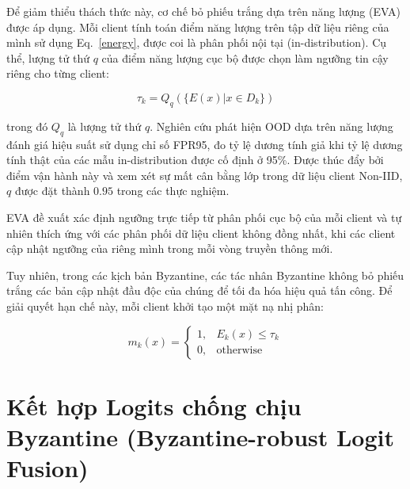 Để giảm thiểu thách thức này, cơ chế bỏ phiếu trắng dựa trên năng lượng (EVA) được áp dụng. Mỗi client tính toán điểm năng lượng trên tập dữ liệu riêng của mình sử dụng Eq.~\ref{energy}, được coi là phân phối nội tại (in-distribution). Cụ thể, lượng tử thứ $q$ của điểm năng lượng cục bộ được chọn làm ngưỡng tin cậy riêng cho từng client:

\begin{equation}
\label{eva}
\tau_k=Q_q(\{E(x) | x \in D_k\})
\end{equation}

trong đó $Q_q$ là lượng tử thứ $q$. Nghiên cứu phát hiện OOD dựa trên năng lượng \cite{liu2020energy} đánh giá hiệu suất sử dụng chỉ số FPR95, đo tỷ lệ dương tính giả khi tỷ lệ dương tính thật của các mẫu in-distribution được cố định ở 95\%. Được thúc đẩy bởi điểm vận hành này và xem xét sự mất cân bằng lớp trong dữ liệu client Non-IID, $q$ được đặt thành $0.95$ trong các thực nghiệm.

EVA đề xuất xác định ngưỡng trực tiếp từ phân phối cục bộ của mỗi client và tự nhiên thích ứng với các phân phối dữ liệu client không đồng nhất, khi các client cập nhật ngưỡng của riêng mình trong mỗi vòng truyền thông mới.

Tuy nhiên, trong các kịch bản Byzantine, các tác nhân Byzantine không bỏ phiếu trắng các bản cập nhật đầu độc của chúng để tối đa hóa hiệu quả tấn công. Để giải quyết hạn chế này, mỗi client khởi tạo một mặt nạ nhị phân:

\begin{equation}
\label{energymask}
m_k(x) =
\begin{cases}
1,  &E_k(x) \leq \tau_k \\
0, &\text{otherwise}
\end{cases}
\end{equation}

\section{Kết hợp Logits chống chịu Byzantine (Byzantine-robust Logit Fusion)}
\label{sec:blom}

